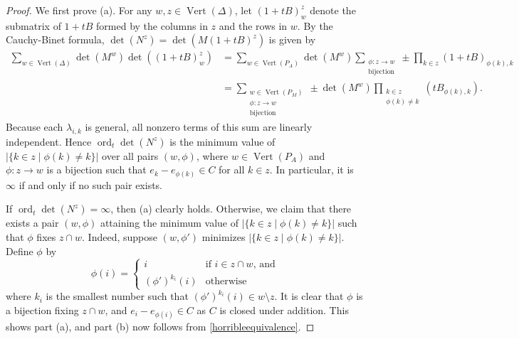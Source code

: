 \documentclass[12pt]{amsart}
\newcommand{\Vt}{{\operatorname{Vert}}}
\newcommand{\ord}{{\operatorname{ord}}}
\theoremstyle{plain}
\theoremstyle{definition}
\theoremstyle{remark}
\begin{document}
\begin{proof}
We first prove (a). For any $w,z \in \Vt(\Delta)$, let $(1+tB)^z_w$ denote the submatrix of $1 + tB$ formed by the columns in $z$ and the rows in $w$. By the Cauchy-Binet formula, $\det(N^z) = \det(M (1+tB)^z)$ is given by
\begin{align*}
\sum_{w \in \Vt(\Delta)} \det(M^w) \det ((1+tB)^z_w) &= \sum_{w \in \Vt(P_A)} \det(M^w) \sum_{\substack{\phi : z \to w \\ \text{bijection}}} \pm \prod_{k \in z} (1+tB)_{\phi(k), k} \\
&= \sum_{\substack{w \in \Vt(P_M) \\ \phi : z \to w \\ \text{bijection}}} \pm  \det(M^w) \prod_{\substack{k \in z \\ \phi(k) \neq k}} (tB_{\phi(k),k}).
\end{align*}
Because each $\lambda_{i, k}$ is general, all nonzero terms of this sum are linearly independent. Hence $\ord_t \det(N^z)$ is the minimum value of $|\{k \in z \mid \phi(k) \neq k\}|$ over all pairs $(w, \phi)$, where $w\in \Vt(P_A)$ and $\phi:z \to w$ is a bijection such that $e_k-e_{\phi(k)} \in C$ for all $k \in z$. In particular, it is $\infty$ if and only if no such pair exists.

If $\ord_t \det(N^z) = \infty$, then (a) clearly holds. Otherwise, we claim that there exists a pair $(w,\phi)$ attaining the minimum value of $|\{k \in z \mid \phi(k) \neq k\}|$ such that $\phi$ fixes $z \cap w$. Indeed, suppose $(w, \phi')$ minimizes $|\{k \in z \mid \phi(k) \neq k\}|$. Define $\phi$ by $$\phi(i)=\begin{cases}i & \text{if $i \in z \cap w$, and}\\(\phi')^{k_i}(i) & \text{otherwise}\end{cases}$$ where $k_i$ is the smallest number such that $(\phi')^{k_i}(i) \in w \setminus z$. It is clear that $\phi$ is a bijection fixing $z\cap w$, and $e_i-e_{\phi(i)} \in C$ as $C$ is closed under addition. This shows part (a), and part (b) now follows from \cref{horribleequivalence}.
\end{proof}
\end{document}
